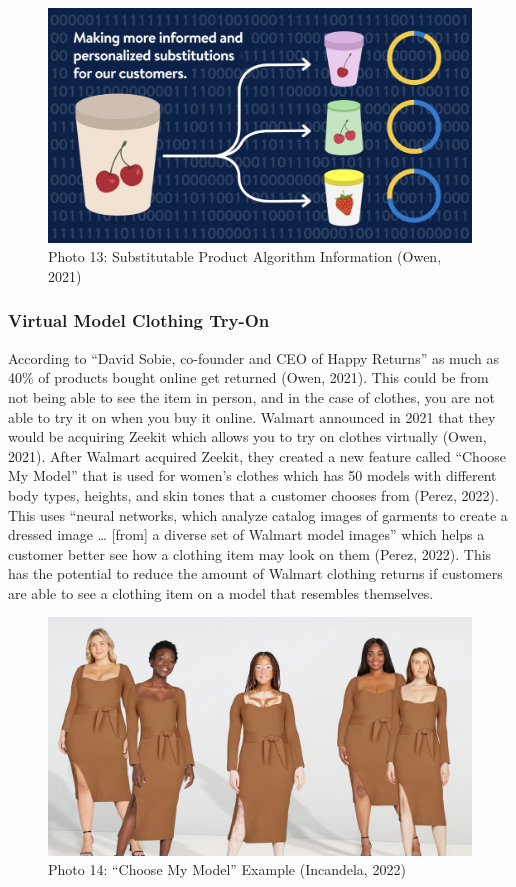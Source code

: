 \documentclass[
]{article}
\begin{document}
\begin{figure}
\centering
\includegraphics{Walmart-AI-Item-Substitution.png}
\caption{Photo 13: Substitutable Product Algorithm Information (Owen, 2021)}
\end{figure}

\hypertarget{virtual-model-clothing-try-on}{%
\subsubsection{Virtual Model Clothing Try-On}\label{virtual-model-clothing-try-on}}

According to ``David Sobie, co-founder and CEO of Happy Returns'' as much as 40\% of products bought online get returned (Owen, 2021). This could be from not being able to see the item in person, and in the case of clothes, you are not able to try it on when you buy it online. Walmart announced in 2021 that they would be acquiring Zeekit which allows you to try on clothes virtually (Owen, 2021). After Walmart acquired Zeekit, they created a new feature called ``Choose My Model'' that is used for women's clothes which has 50 models with different body types, heights, and skin tones that a customer chooses from (Perez, 2022). This uses ``neural networks, which analyze catalog images of garments to create a dressed image \ldots{} {[}from{]} a diverse set of Walmart model images'' which helps a customer better see how a clothing item may look on them (Perez, 2022). This has the potential to reduce the amount of Walmart clothing returns if customers are able to see a clothing item on a model that resembles themselves.

\begin{figure}
\centering
\includegraphics{ChooseMyModel.jpg}
\caption{Photo 14: ``Choose My Model'' Example (Incandela, 2022)}
\end{figure}
\end{document}
